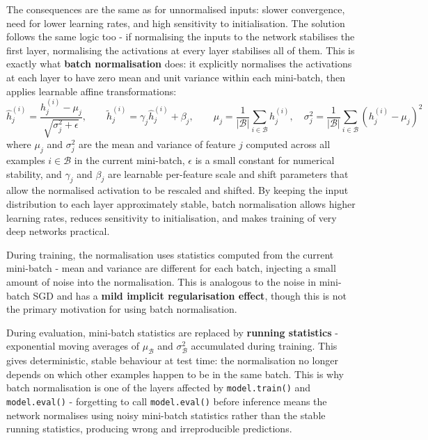 The consequences are the same as for unnormalised inputs: slower convergence, need for lower learning rates, and high sensitivity to initialisation. The solution follows the same logic too - if normalising the inputs to the network stabilises the first layer, normalising the activations at every layer stabilises all of them. This is exactly what \textbf{batch normalisation} does: it explicitly normalises the activations at each layer to have zero mean and unit variance within each mini-batch, then applies learnable affine transformations:
\begin{equation}
    \hat{h}_j^{(i)} = \frac{h_j^{(i)} - \mu_j}{\sqrt{\sigma^2_j + \epsilon}},
    \qquad
    \tilde{h}_j^{(i)} = \gamma_j \hat{h}_j^{(i)} + \beta_j, 
    \qquad
    \mu_j = \frac{1}{|\mathcal{B}|}\sum_{i \in \mathcal{B}} h_j^{(i)}, \quad 
    \sigma^2_j = \frac{1}{|\mathcal{B}|}\sum_{i \in \mathcal{B}} (h_j^{(i)} - \mu_j)^2
\end{equation}
where $\mu_j$ and $\sigma^2_j$ are the mean and variance of feature $j$ computed across all examples $i \in \mathcal{B}$ in the current mini-batch, $\epsilon$ is a small constant for numerical stability, and $\gamma_j$ and $\beta_j$ are learnable per-feature scale and shift parameters that allow the normalised activation to be rescaled and shifted.
By keeping the input distribution to each layer approximately stable, batch normalisation allows higher learning rates, reduces sensitivity to initialisation, and makes training of very deep networks practical.

During training, the normalisation uses statistics computed from the current mini-batch - mean and variance are different for each batch, injecting a small amount of noise into the normalisation. This is analogous to the noise in mini-batch SGD and has a \textbf{mild implicit regularisation effect}, though this is not the primary motivation for using batch normalisation.

During evaluation, mini-batch statistics are replaced by \textbf{running statistics} - exponential moving averages of $\mu_{\mathcal{B}}$ and $\sigma^2_{\mathcal{B}}$ accumulated during training. This gives deterministic, stable behaviour at test time: the normalisation no longer depends on which other examples happen to be in the same batch. This is why batch normalisation is one of the layers affected by \texttt{model.train()} and \texttt{model.eval()} - forgetting to call \texttt{model.eval()} before inference means the network normalises using noisy mini-batch statistics rather than the stable running statistics, producing wrong and irreproducible predictions.

